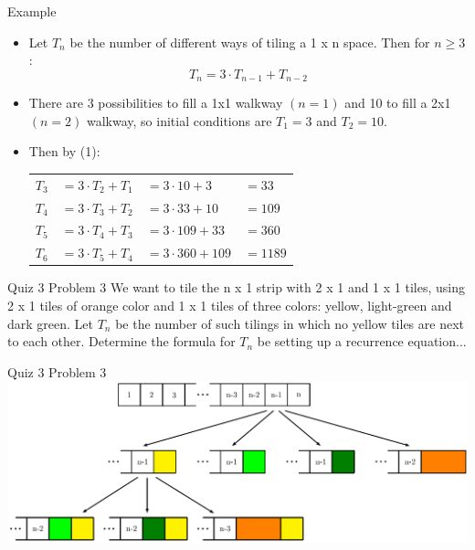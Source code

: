 \documentclass{beamer}
\begin{document}
\begin{frame}{Example}
    \begin{itemize}
        \item Let $T_n$ be the number of different ways of tiling a 1 x n space. Then for $n \geq 3$:
        \begin{equation}\tag{1}
            T_n = 3 \cdot T_{n-1} + T_{n-2}
        \end{equation}
        \item There are 3 possibilities to fill a 1x1 walkway $(n=1)$ and 10 to fill a 2x1 $(n=2)$ walkway, so initial conditions are  $T_1 = 3$ and  $T_2 = 10$.
        \item Then by (1): \\
            \begin{tabular}{l l l l}
                $T_3$ & $=3 \cdot T_{2} + T_{1}$ & $= 3 \cdot 10  + 3$   & $= 33$   \\
                $T_4$ & $=3 \cdot T_{3} + T_{2}$ & $= 3 \cdot 33  + 10$  & $= 109$  \\
                $T_5$ & $=3 \cdot T_{4} + T_{3}$ & $= 3 \cdot 109 + 33$  & $= 360$  \\
                $T_6$ & $=3 \cdot T_{5} + T_{4}$ & $= 3 \cdot 360 + 109$ & $= 1189$ \\
            \end{tabular}   
    \end{itemize}
\end{frame}

\begin{frame}{Quiz 3 Problem 3}
We want to tile the n x 1 strip with 2 x 1 and 1 x 1 tiles, using 2 x 1 tiles of orange color and 1 x 1 tiles of three colors: yellow, light-green and dark green.  Let $T_n$ be the number of such tilings in which no yellow tiles are next to each other.  Determine the formula for $T_n$ be setting up a recurrence equation...
\end{frame}

\begin{frame}{Quiz 3 Problem 3}
    \centering
    \includegraphics[width=1\linewidth]{tiling2}
\end{frame}
\end{document}
